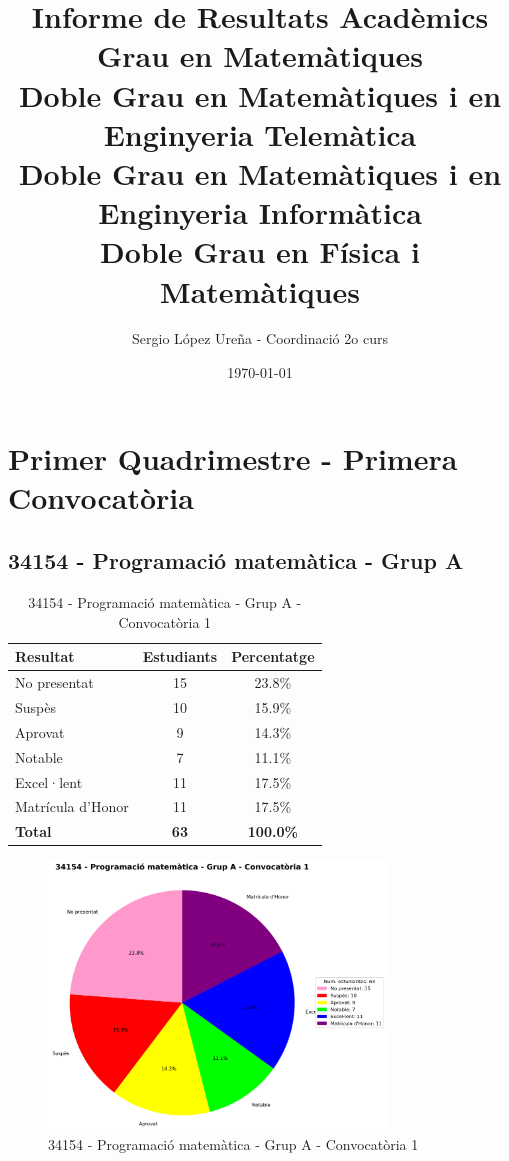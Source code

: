 \documentclass[12pt,a4paper]{article}
\title{Informe de Resultats Acadèmics\\
\small Grau en Matemàtiques\\
\small Doble Grau en Matemàtiques i en Enginyeria Telemàtica\\
\small Doble Grau en Matemàtiques i en Enginyeria Informàtica\\
\small Doble Grau en Física i Matemàtiques}
\author{Sergio López Ureña - Coordinació 2o curs}
\date{\today}
\begin{document}
\maketitle
\tableofcontents
\newpage


\section{Primer Quadrimestre - Primera Convocatòria}


\subsection{34154 - Programació matemàtica - Grup A}


\begin{table}[H]
\centering
\caption{34154 - Programació matemàtica - Grup A - Convocatòria 1}
\begin{tabular}{|l|c|c|}
\hline
\textbf{Resultat} & \textbf{Estudiants} & \textbf{Percentatge} \\
\hline
No presentat & 15 & 23.8\% \\
Suspès & 10 & 15.9\% \\
Aprovat & 9 & 14.3\% \\
Notable & 7 & 11.1\% \\
Excel·lent & 11 & 17.5\% \\
Matrícula d'Honor & 11 & 17.5\% \\
\hline
\textbf{Total} & \textbf{63} & \textbf{100.0\%} \\
\hline
\end{tabular}
\end{table}

\begin{figure}[H]
\centering
\includegraphics[width=0.8\textwidth]{graficos/34154_A_1Q1_0.png}
\caption{34154 - Programació matemàtica - Grup A - Convocatòria 1}
\end{figure}
\end{document}
